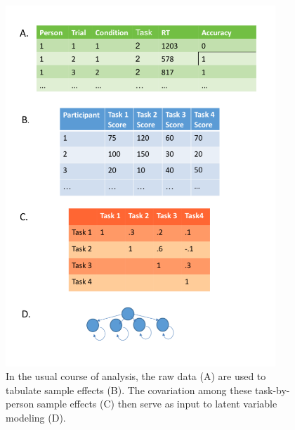 \documentclass[
  ,man]{apa6}
\begin{document}
\begin{figure}
\includegraphics[width=4in]{dataAnalysis2} \caption{In the usual course of analysis, the raw data (A) are used to tabulate sample effects (B).  The covariation among these task-by-person sample effects (C) then serve as input to latent variable modeling (D).}\label{fig:usual}
\end{figure}
\end{document}
